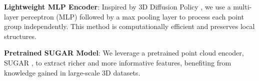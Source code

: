 \textbf{Lightweight MLP Encoder}: Inspired by 3D Diffusion Policy \cite{ze20243d}, we use a multi-layer perceptron (MLP) followed by a max pooling layer to process each point group independently. This method is computationally efficient and preserves local structures.

\textbf{Pretrained SUGAR Model}: We leverage a pretrained point cloud encoder, SUGAR \cite{Chen_2024_SUGAR}, to extract richer and more informative features, benefiting from knowledge gained in large-scale 3D datasets.









